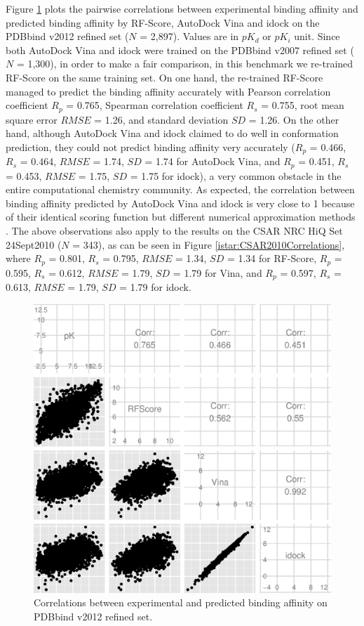 Figure \ref{istar:PDBbind2012Correlations} plots the pairwise correlations between experimental binding affinity and predicted binding affinity by RF-Score, AutoDock Vina and idock on the PDBbind v2012 refined set ($N$ = 2,897). Values are in $pK_d$ or $pK_i$ unit. Since both AutoDock Vina and idock were trained on the PDBbind v2007 refined set ($N$ = 1,300), in order to make a fair comparison, in this benchmark we re-trained RF-Score on the same training set. On one hand, the re-trained RF-Score managed to predict the binding affinity accurately with Pearson correlation coefficient $R_p$ = 0.765, Spearman correlation coefficient $R_s$ = 0.755, root mean square error $RMSE$ = 1.26, and standard deviation $SD$ = 1.26. On the other hand, although AutoDock Vina and idock claimed to do well in conformation prediction, they could not predict binding affinity very accurately ($R_p$ = 0.466, $R_s$ = 0.464, $RMSE$ = 1.74, $SD$ = 1.74 for AutoDock Vina, and $R_p$ = 0.451, $R_s$ = 0.453, $RMSE$ = 1.75, $SD$ = 1.75 for idock), a very common obstacle in the entire computational chemistry community. As expected, the correlation between binding affinity predicted by AutoDock Vina and idock is very close to 1 because of their identical scoring function but different numerical approximation methods \citep{1153}. The above observations also apply to the results on the CSAR NRC HiQ Set 24Sept2010 ($N$ = 343), as can be seen in Figure \ref{istar:CSAR2010Correlations}, where $R_p$ = 0.801, $R_s$ = 0.795, $RMSE$ = 1.34, $SD$ = 1.34 for RF-Score, $R_p$ = 0.595, $R_s$ = 0.612, $RMSE$ = 1.79, $SD$ = 1.79 for Vina, and $R_p$ = 0.597, $R_s$ = 0.613, $RMSE$ = 1.79, $SD$ = 1.79 for idock.

\begin{figure}
\begin{center}
\includegraphics[width=\linewidth]{../istar/PDBbind2012Correlations.eps}
\end{center}
\caption{Correlations between experimental and predicted binding affinity on PDBbind v2012 refined set.}
\label{istar:PDBbind2012Correlations}
\end{figure}

